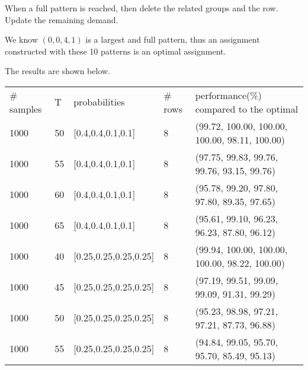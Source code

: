 When a full pattern is reached, then delete the related groups and the row. Update the remaining demand.

We know $(0,0,4,1)$ is a largest and full pattern, thus an assignment constructed with these 10 patterns is an optimal assignment.

The results are shown below.


\begin{table}[ht]
  \begin{tabular}{l|l|l|l|l}
  \hline
  \# samples & T & probabilities & \# rows & performance(\%) compared to the optimal \\
  1000  & 50  & [0.4,0.4,0.1,0.1] & 8 & (99.72, 100.00, 100.00, 100.00, 98.11, 100.00) \\
  1000  & 55  & [0.4,0.4,0.1,0.1] & 8 & (97.75, 99.83, 99.76, 99.76, 93.15, 99.76) \\ %
  1000  & 60  & [0.4,0.4,0.1,0.1] & 8 & (95.78, 99.20, 97.80, 97.80, 89.35, 97.65) \\
  1000  & 65  & [0.4,0.4,0.1,0.1] & 8 & (95.61, 99.10, 96.23, 96.23, 87.80, 96.12) \\
  \hline
  1000  & 40  & [0.25,0.25,0.25,0.25] & 8 & (99.94, 100.00, 100.00, 100.00, 98.22, 100.00) \\
  1000  & 45  & [0.25,0.25,0.25,0.25] & 8 & (97.19, 99.51, 99.09, 99.09, 91.31, 99.29) \\
  1000  & 50  & [0.25,0.25,0.25,0.25] & 8 & (95.23, 98.98, 97.21, 97.21, 87.73, 96.88) \\
  1000  & 55  & [0.25,0.25,0.25,0.25] & 8 & (94.84, 99.05, 95.70, 95.70, 85.49, 95.13) \\
  \end{tabular}
\end{table}

\newpage
